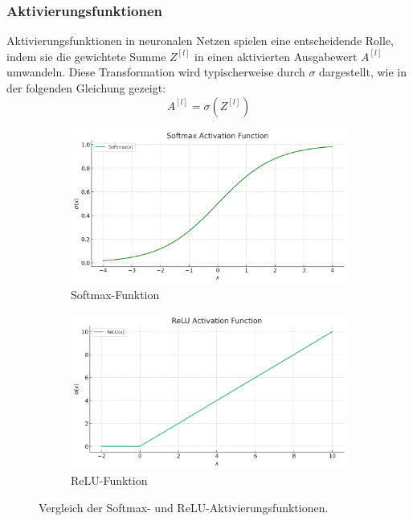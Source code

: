\subsubsection{Aktivierungsfunktionen}
Aktivierungsfunktionen in neuronalen Netzen spielen eine entscheidende Rolle, indem sie die gewichtete Summe \( Z^{[l]} \) in einen aktivierten Ausgabewert \( A^{[l]} \) umwandeln. Diese Transformation wird typischerweise durch \( \sigma \) dargestellt, wie in der folgenden Gleichung gezeigt:
%
\begin{equation} \label{eq:activation_function}
A^{[l]} = \sigma(Z^{[l]})
\end{equation}
%
\begin{figure}[htbp]
  \centering
  \begin{subfigure}{0.45\textwidth}
    \includegraphics[width=\textwidth]{2Grundlagen/22SoftMax.png}
    \caption{Softmax-Funktion}
    \label{fig:softmax}
  \end{subfigure}
  \hfill
  \begin{subfigure}{0.45\textwidth}
    \includegraphics[width=\textwidth]{2Grundlagen/22ReLU.png}
    \caption{ReLU-Funktion}
    \label{fig:relu}
  \end{subfigure}
  \caption{Vergleich der Softmax- und ReLU-Aktivierungsfunktionen.}
\end{figure}
%
